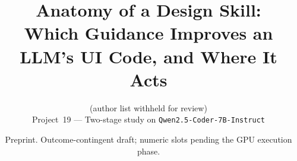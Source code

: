 \documentclass[10pt]{article}
\title{\textbf{Anatomy of a Design Skill:\\[2pt]
Which Guidance Improves an LLM's UI Code, and Where It Acts}}
\author{%
  \normalsize (author list withheld for review)\\
  \normalsize Project~19 --- Two-stage study on \texttt{Qwen2.5-Coder-7B-Instruct}
}
\date{Preprint. Outcome-contingent draft; numeric slots pending the GPU execution phase.}
\begin{document}
\maketitle













\small


\normalsize
\appendix

\end{document}
